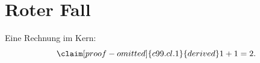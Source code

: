 \chapter{Roter Fall}\label{c99}

Eine Rechnung im Kern:
\begin{equation}\label{c99.eq.eins}\claim[proof-omitted]{c99.cl.1}{derived}
  1 + 1 = 2.
\end{equation}

